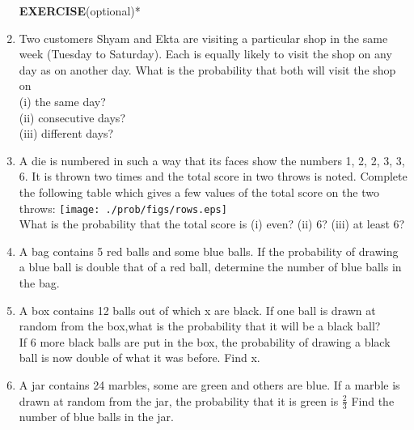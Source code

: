 \begin{enumerate}[label=\arabic*.,ref=\thesubsection.\theenumi]
{\Large \textbf{EXERCISE}(optional)*}\\
\item Two customers Shyam and Ekta are visiting a particular shop in the same week (Tuesday
to Saturday). Each is equally likely to visit the shop on any day as on another day. What
is the probability that both will visit the shop on\\
(i) the same day?\\
(ii) consecutive days?\\
(iii) different days?
\item A die is numbered in such a way that its faces show the numbers 1, 2, 2, 3, 3, 6. It is thrown two times and the total score in two throws is noted. Complete the following
table which gives a few values of the total score on the two throws:
\texttt{[image: ./prob/figs/rows.eps]}\\
What is the probability that the total score is
(i) even? (ii) 6? (iii) at least 6?
\item A bag contains 5 red balls and some blue balls. If the probability of drawing a blue ball is double that of a red ball, determine the number of blue balls in the bag.
\item A box contains 12 balls out of which x are black. If one ball is drawn at random from the box,what is the probability that it will be a black ball?\\
If 6 more black balls are put in the box, the probability of drawing a black ball is now double of what it was before. Find x.
\item A jar contains 24 marbles, some are green and others are blue. If a marble is drawn at random from the jar, the probability that it is green is $\frac{2}{3}$ Find the number of blue balls in the jar.
    \end{enumerate}
%
    
